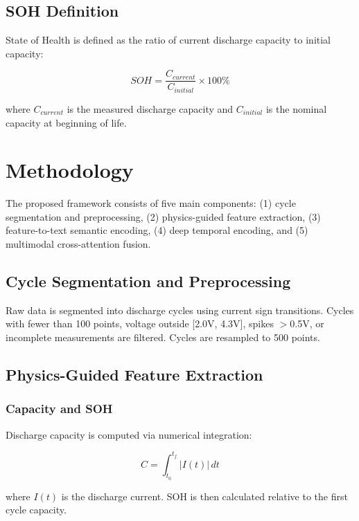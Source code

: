 \documentclass[conference]{IEEEtran}
\begin{document}
\subsection{SOH Definition}

State of Health is defined as the ratio of current discharge capacity to initial capacity:

\begin{equation}
    SOH = \frac{C_{current}}{C_{initial}} \times 100\%
\end{equation}

where $C_{current}$ is the measured discharge capacity and $C_{initial}$ is the nominal capacity at beginning of life.

\section{Methodology}

The proposed framework consists of five main components: (1) cycle segmentation and preprocessing, (2) physics-guided feature extraction, (3) feature-to-text semantic encoding, (4) deep temporal encoding, and (5) multimodal cross-attention fusion.

\subsection{Cycle Segmentation and Preprocessing}

Raw data is segmented into discharge cycles using current sign transitions. Cycles with fewer than 100 points, voltage outside [2.0V, 4.3V], spikes $>$0.5V, or incomplete measurements are filtered. Cycles are resampled to 500 points.

\subsection{Physics-Guided Feature Extraction}

\subsubsection{Capacity and SOH}

Discharge capacity is computed via numerical integration:

\begin{equation}
    C = \int_{t_0}^{t_f} |I(t)| \, dt
\end{equation}

where $I(t)$ is the discharge current. SOH is then calculated relative to the first cycle capacity.
\end{document}
